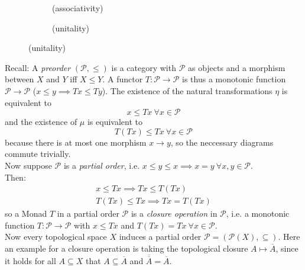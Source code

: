 \begin{definition}[Monad]
\begin{figure}[H]
\centering
\begin{subfigure}{0.4\textwidth}
\centering
\caption*{(associativity)}
\end{subfigure}
\hspace{2em}
\begin{subfigure}{0.4\textwidth}
\centering
\caption*{(unitality)}
\end{subfigure}
\end{figure}

\end{definition}

\begin{example}[preorder]
Recall: A \textit{preorder} $(\mathcal{P},\le)$ is a category with $\mathcal{P}$ as objects and 
a morphism between $X$ and $Y$ iff $X \le Y$.
A functor $T\colon \mathcal{P} \to \mathcal{P}$ is thus a monotonic function $\mathcal{P}\to \mathcal{P}$
($x \le y \implies Tx\le Ty$).
The existence of the natural transformations $\eta$ is equivalent to
\[x \le Tx \ \forall x \in \mathcal{P}\]
and the existence of $\mu$ is equivalent to
\[T(Tx) \le Tx \ \forall x \in \mathcal{P}\] 
because there is at most one morphism $x \to y$, so the neccessary diagrams commute trivially.\\
Now suppose $\mathcal{P}$ is a \textit{partial order}, i.e. $x \le y \le x \implies x = y \ \forall x,y \in \mathcal{P}$. \\
Then:
\begin{align*}
    x \le Tx \implies Tx \le T(Tx) \\
    T(Tx) \le Tx \implies Tx = T(Tx)
\end{align*}
so a Monad $T$ in a partial order $\mathcal{P}$ is a \textit{closure operation} in $\mathcal{P}$, i.e. 
a monotonic function $T \colon \mathcal{P} \to \mathcal{P}$ 
with $x \le Tx$ and $T(Tx)=Tx \ \forall x \in \mathcal{P}.$ \\
Now every topological space $X$ induces a partial order $\mathcal{P} = (\mathscr{P}(X),\subseteq)$.
Here an example for a closure operation is taking the topological closure $A \mapsto \overline{A}$,
since it holds for all $A \subseteq X$ that $A \subseteq \overline{A}$ and
$\overline{\overline{A}} = \overline{A}$.
\end{example}

